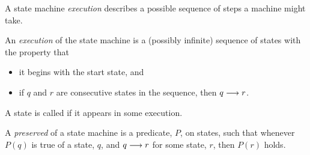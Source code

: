 \iffalse

To formulate it precisely, we need a definition of
\term{reachability.}

\begin{definition}
The \term{reachable states} of a state machine, $M$, are defined
recursively as follows:
\begin{itemize}
\item the start state is reachable, and
\item if $p$ is a reachable state of $M$, and $p \movesto q$ is a
  transition of $M$, then $q$ is also a reachable state of $M$.
\end{itemize}
\end{definition}
\fi

A state machine \emph{execution} describes a possible sequence of
steps a machine might take.

\begin{definition}
An \emph{execution}%
of the state machine is a (possibly infinite)
sequence of states with the property that
\begin{itemize}
\item it begins with the start state, and
\item if $q$ and $r$ are consecutive states in the sequence, then $q
  \mathrel{\longrightarrow} r$.
\end{itemize}
A state is called  if it appears in some execution.
\end{definition}

\begin{definition}
  A \emph{preserved} 
of a state machine is a predicate, $P$, on
  states, such that whenever $P(q)$ is true of a state, $q$, and $q
  \mathrel{\longrightarrow} r$ for some state, $r$, then $P(r)$ holds.
\end{definition}



